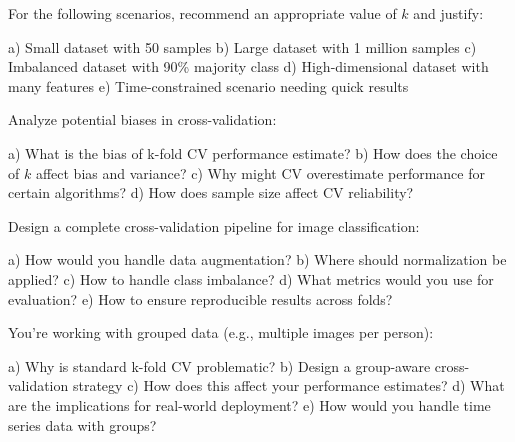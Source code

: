 \documentclass{article}
\newcounter{exercise}
\begin{document}
\begin{tcolorbox}[colback=gray!5!white,colframe=gray!75!black,title=Problem \stepcounter{exercise}: Choosing K Value]

For the following scenarios, recommend an appropriate value of $k$ and justify:

a) Small dataset with 50 samples
b) Large dataset with 1 million samples  
c) Imbalanced dataset with 90\% majority class
d) High-dimensional dataset with many features
e) Time-constrained scenario needing quick results
\end{tcolorbox}

\begin{tcolorbox}[colback=gray!5!white,colframe=gray!75!black,title=Problem \stepcounter{exercise}: Cross-Validation Bias]

Analyze potential biases in cross-validation:

a) What is the bias of k-fold CV performance estimate?
b) How does the choice of $k$ affect bias and variance?
c) Why might CV overestimate performance for certain algorithms?
d) How does sample size affect CV reliability?
\end{tcolorbox}

\begin{tcolorbox}[colback=gray!5!white,colframe=gray!75!black,title=Problem \stepcounter{exercise}: Practical Implementation]

Design a complete cross-validation pipeline for image classification:

a) How would you handle data augmentation?
b) Where should normalization be applied?
c) How to handle class imbalance?
d) What metrics would you use for evaluation?
e) How to ensure reproducible results across folds?
\end{tcolorbox}

\begin{tcolorbox}[colback=gray!5!white,colframe=gray!75!black,title=Problem \stepcounter{exercise}: Advanced Challenge]

You're working with grouped data (e.g., multiple images per person):

a) Why is standard k-fold CV problematic?
b) Design a group-aware cross-validation strategy
c) How does this affect your performance estimates?
d) What are the implications for real-world deployment?
e) How would you handle time series data with groups?
\end{tcolorbox}
\end{document}
